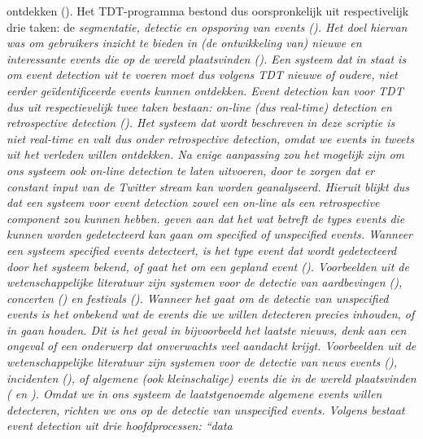 ontdekken ({\citealt{allan2002introduction}). Het TDT-programma bestond dus oorspronkelijk uit 
respectivelijk drie taken: de \it{segmentatie}, \it{detectie} en \it{opsporing} van events 
(\citealt{atefeh2013survey}). Het doel hiervan was om gebruikers inzicht te bieden in (de 
ontwikkeling van) nieuwe en interessante events die op de wereld 
plaatsvinden ({\citealt{allan2002introduction}).
\vl
Een systeem dat in staat is om event detection uit te voeren moet dus volgens 
TDT nieuwe of oudere, niet eerder ge\"identificeerde events kunnen ontdekken. 
Event detection kan voor TDT dus uit respectievelijk twee taken bestaan: \it{on-line} (dus 
\it{real-time}) \it{detection} en \it{retrospective detection} (\citealt{yang1998study}). Het systeem dat 
wordt beschreven in deze scriptie is niet real-time en valt dus onder retrospective detection, 
omdat we events in tweets uit het verleden willen ontdekken. Na enige aanpassing 
zou het mogelijk zijn om ons systeem ook on-line detection te laten uitvoeren, door te 
zorgen dat er constant input van de Twitter stream kan worden geanalyseerd. 
Hieruit blijkt dus dat een systeem voor event detection zowel een on-line als een retrospective 
component zou kunnen hebben.
\vl
\citeauthor{atefeh2013survey} geven aan dat het wat betreft de types events die kunnen worden 
gedetecteerd kan gaan om \it{specified} of \it{unspecified} events. Wanneer een systeem 
specified events detecteert, is het type event dat wordt gedetecteerd door het 
systeem bekend, of gaat het om een gepland event (\citealt{atefeh2013survey}). Voorbeelden 
uit de wetenschappelijke literatuur zijn systemen voor de detectie van 
aardbevingen (\citealt{sakaki2010earthquake}), concerten (\citealt{benson2011event}) en festivals (\citealt{lee2010measuring}). 
Wanneer het gaat om de detectie van unspecified events is het onbekend wat 
de events die we willen detecteren precies inhouden, of in gaan houden. Dit is 
het geval in bijvoorbeeld het laatste nieuws, denk aan een ongeval 
of een onderwerp dat onverwachts veel aandacht krijgt. Voorbeelden uit de 
wetenschappelijke literatuur zijn systemen voor de detectie van news events
(\citealt{sankaranarayanan2009twitterstand}), incidenten (\citealt{abel2012twitcident}), of algemene (ook kleinschalige) events die in de wereld
plaatsvinden (\citealt{walther2013geo} en \citealt{becker2011beyond}). Omdat we in ons systeem de laatstgenoemde
algemene events willen detecteren, richten we ons op de detectie van unspecified
events.
\vl
Volgens \citeauthor{atefeh2013survey} bestaat event detection uit drie hoofdprocessen: \it{``data 
}}}
